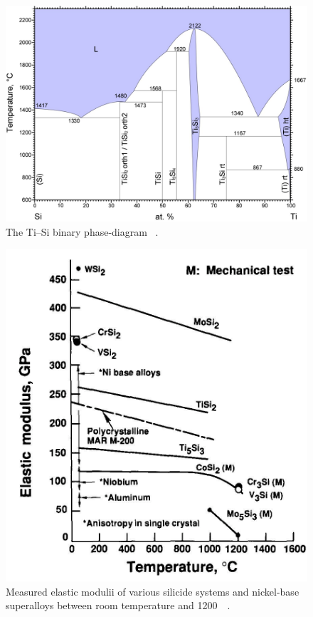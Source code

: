 %
\begin{figure}[H]
\begin{center}
\includegraphics[width=14cm]{TiSi}
\caption{The Ti--Si binary phase-diagram ~\cite{seifert96}.}\label{fig:TiSi}
\end{center}
\end{figure}
%
%
\begin{figure}[H]
\begin{center}
\includegraphics[width=.8\textwidth]{creepshah92_1}
\vspace{-.3cm}
\caption{Measured elastic modulii of various silicide systems and nickel-base superalloys between room temperature and 1200\celsius\ ~\cite{shah92}.}\label{fig:creepshah92_3}
\end{center}
\end{figure}
\vspace{-.5cm}
%


